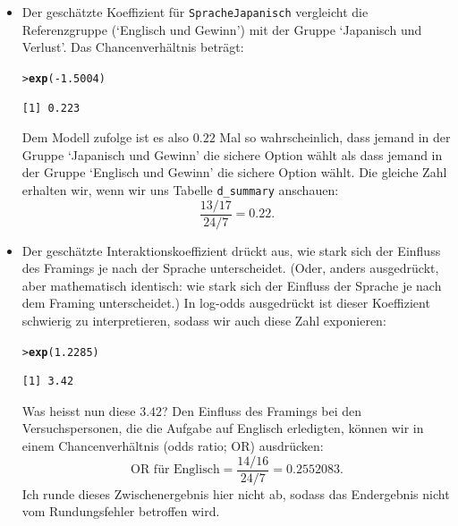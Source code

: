 \documentclass[oneside, 10pt]{book}\usepackage[]{graphicx}\usepackage[]{xcolor}
\makeatletter
\newcommand{\hlnum}[1]{\textcolor[rgb]{0.686,0.059,0.569}{#1}}%
\newcommand{\hlopt}[1]{\textcolor[rgb]{0,0,0}{#1}}%
\newcommand{\hlstd}[1]{\textcolor[rgb]{0.345,0.345,0.345}{#1}}%
\newcommand{\hlkwd}[1]{\textcolor[rgb]{0.737,0.353,0.396}{\textbf{#1}}}%
\newenvironment{kframe}{%
 \def\at@end@of@kframe{}%
 \ifinner\ifhmode%
  \def\at@end@of@kframe{\end{minipage}}%
  \begin{minipage}{\columnwidth}%
 \fi\fi%
 \def\FrameCommand##1{\hskip\@totalleftmargin \hskip-\fboxsep
 \colorbox{shadecolor}{##1}\hskip-\fboxsep
     \hskip-\linewidth \hskip-\@totalleftmargin \hskip\columnwidth}%
 \MakeFramed {\advance\hsize-\width
   \@totalleftmargin\z@ \linewidth\hsize
   \@setminipage}}%
 {\par\unskip\endMakeFramed%
 \at@end@of@kframe}
\newenvironment{knitrout}{}{} %
\makeatother
\begin{document}
\begin{itemize}
  \item Der geschätzte Koeffizient für \texttt{SpracheJapanisch}
vergleicht die Referenzgruppe (`Englisch und Gewinn')
mit der Gruppe `Japanisch und Verlust'.
Das Chancenverhältnis beträgt:
\begin{knitrout}
\color{fgcolor}\begin{kframe}
\begin{alltt}
\hlstd{> }\hlkwd{exp}\hlstd{(}\hlopt{-}\hlnum{1.5004}\hlstd{)}
\end{alltt}
\begin{verbatim}
[1] 0.223
\end{verbatim}
\end{kframe}
\end{knitrout}
  Dem Modell zufolge ist es also $0.22$ Mal so wahrscheinlich,
  dass jemand in der Gruppe `Japanisch und Gewinn' die sichere Option wählt
  als dass jemand in der Gruppe `Englisch und Gewinn' die sichere Option wählt.
  Die gleiche Zahl erhalten wir, wenn wir uns Tabelle \texttt{d\_summary}
  anschauen:
  \[
    \frac{13\Big/17}{24\Big/7} = 0.22.
  \]

\item Der geschätzte Interaktionskoeffizient drückt aus,
wie stark sich der Einfluss des Framings je nach der Sprache
unterscheidet. (Oder, anders ausgedrückt, aber mathematisch identisch:
wie stark sich der Einfluss der Sprache je nach dem Framing unterscheidet.)
In log-odds ausgedrückt ist dieser Koeffizient schwierig zu interpretieren,
sodass wir auch diese Zahl exponieren:
\begin{knitrout}
\color{fgcolor}\begin{kframe}
\begin{alltt}
\hlstd{> }\hlkwd{exp}\hlstd{(}\hlnum{1.2285}\hlstd{)}
\end{alltt}
\begin{verbatim}
[1] 3.42
\end{verbatim}
\end{kframe}
\end{knitrout}

Was heisst nun diese $3.42$? Den Einfluss des Framings bei den Versuchspersonen,
die die Aufgabe auf Englisch erledigten, können wir in einem Chancenverhältnis
(odds ratio; OR) ausdrücken:
\[
  \textrm{OR für Englisch} = \frac{14\Big/16}{24\Big/7} = 0.2552083.
  \]
Ich runde dieses Zwischenergebnis hier nicht ab, sodass das Endergebnis nicht
vom Rundungsfehler betroffen wird.


\end{itemize}
\end{document}
